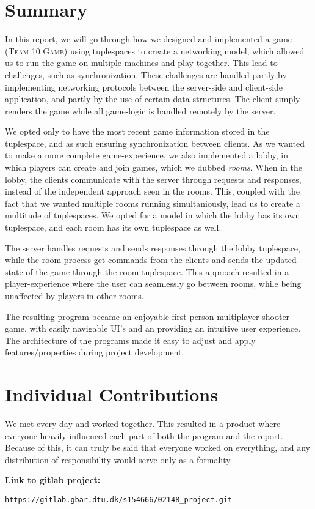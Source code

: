 \chapter{Summary}
In this report, we will go through how we designed and implemented a game (\textsc{Team 10 Game}) using tuplespaces to create a networking model, which allowed us to run the game on multiple machines and play together. This lead to challenges, such as synchronization. These challenges are handled partly by implementing networking protocols between the server-side and client-side application, and partly by the use of certain data structures. The client simply renders the game while all game-logic is handled remotely by the server. 

We opted only to have the most recent game information stored in the tuplespace, and as such ensuring synchronization between clients. As we wanted to make a more complete game-experience, we also implemented a lobby, in which players can create and join games, which we dubbed \textit{rooms}. When in the lobby, the clients communicate with the server through requests and responses, instead of the independent approach seen in the rooms. This, coupled with the fact that we wanted multiple rooms running simultaniously, lead us to create a multitude of tuplespaces. We opted for a model in which the lobby has its own tuplespace, and each room has its own tuplespace as well. 

The server handles requests and sends responses through the lobby tuplespace, while the room process get commands from the clients and sends the updated state of the game through the room tuplespace. This approach resulted in a player-experience where the user can seamlessly go between rooms, while being unaffected by players in other rooms. 

The resulting program became an enjoyable first-person multiplayer shooter game, with easily navigable UI's and an providing an intuitive user experience. The architecture of the programs made it easy to adjust and apply features/properties during project development.

\chapter{Individual Contributions}
We met every day and worked together. This resulted in a product where everyone heavily influenced each part of both the program and the report. Because of this, it can truly be said that everyone worked on everything, and any distribution of responsibility would serve only as a formality.

\textbf{Link to gitlab project:}
\begin{center}
\href{https://gitlab.gbar.dtu.dk/s154666/02148_project.git}{\texttt{https://gitlab.gbar.dtu.dk/s154666/02148\_project.git}}
\end{center}